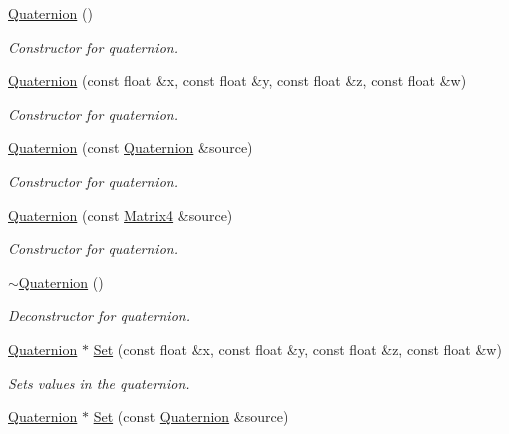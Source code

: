 \begin{DoxyCompactItemize}
\item 
\hyperlink{class_flounder_1_1_quaternion_ad46c815a079376f4916f4d129309f4ce}{Quaternion} ()
\begin{DoxyCompactList}\small\item\em Constructor for quaternion. \end{DoxyCompactList}\item 
\hyperlink{class_flounder_1_1_quaternion_afccac147c6b4290ea5a1cb9719ec2428}{Quaternion} (const float \&x, const float \&y, const float \&z, const float \&w)
\begin{DoxyCompactList}\small\item\em Constructor for quaternion. \end{DoxyCompactList}\item 
\hyperlink{class_flounder_1_1_quaternion_ada868af5f6b360b99cf620d587242046}{Quaternion} (const \hyperlink{class_flounder_1_1_quaternion}{Quaternion} \&source)
\begin{DoxyCompactList}\small\item\em Constructor for quaternion. \end{DoxyCompactList}\item 
\hyperlink{class_flounder_1_1_quaternion_aec0cd32c17e9c2d281d01e2ceaffe965}{Quaternion} (const \hyperlink{class_flounder_1_1_matrix4}{Matrix4} \&source)
\begin{DoxyCompactList}\small\item\em Constructor for quaternion. \end{DoxyCompactList}\item 
\hyperlink{class_flounder_1_1_quaternion_a99c09ed056e8a055d5b362646b2dc4a7}{$\sim$\+Quaternion} ()
\begin{DoxyCompactList}\small\item\em Deconstructor for quaternion. \end{DoxyCompactList}\item 
\hyperlink{class_flounder_1_1_quaternion}{Quaternion} $\ast$ \hyperlink{class_flounder_1_1_quaternion_a7901d31fcaf4447ec92e83254c1fb1ea}{Set} (const float \&x, const float \&y, const float \&z, const float \&w)
\begin{DoxyCompactList}\small\item\em Sets values in the quaternion. \end{DoxyCompactList}\item 
\hyperlink{class_flounder_1_1_quaternion}{Quaternion} $\ast$ \hyperlink{class_flounder_1_1_quaternion_af1db111b50dad4fa640ac036765e2e2b}{Set} (const \hyperlink{class_flounder_1_1_quaternion}{Quaternion} \&source)

\end{DoxyCompactItemize}
